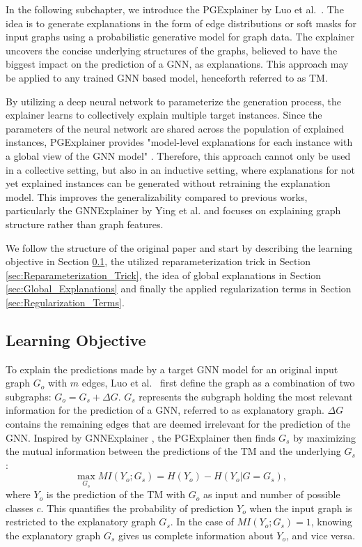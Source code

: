 In the following subchapter, we introduce the PGExplainer by Luo et al.~\cite{luo2020parameterized}. The idea is to generate explanations in the form of edge distributions or soft masks for input graphs using a probabilistic generative model for graph data. The explainer uncovers the concise underlying structures of the graphs, believed to have the biggest impact on the prediction of a GNN, as explanations. This approach may be applied to any trained GNN based model, henceforth referred to as \ac{TM}. 

By utilizing a deep neural network to parameterize the generation process, the explainer learns to collectively explain multiple target instances. Since the parameters of the neural network are shared across the population of explained instances, PGExplainer provides "model-level explanations for each instance with a global view of the GNN model" \cite{luo2020parameterized}. Therefore, this approach cannot only be used in a collective setting, but also in an inductive setting, where explanations for not yet explained instances can be generated without retraining the explanation model. This improves the generalizability compared to previous works, particularly the GNNExplainer by Ying et al. \cite{ying2019gnnexplainer} and focuses on explaining graph structure rather than graph features. \bigskip

We follow the structure of the original paper \cite{luo2020parameterized} and start by describing the learning objective in Section \ref{sec:learning_objective}, the utilized reparameterization trick in Section \ref{sec:Reparameterization_Trick}, the idea of global explanations in Section \ref{sec:Global_Explanations} and finally the applied regularization terms in Section \ref{sec:Regularization_Terms}.

\subsection{Learning Objective}
\label{sec:learning_objective}
To explain the predictions made by a target GNN model for an original input graph $G_o$ with $m$ edges, Luo et al.~\cite{luo2020parameterized} first define the graph as a combination of two subgraphs: $G_o = G_s + \Delta G$. $G_s$ represents the subgraph holding the most relevant information for the prediction of a GNN, referred to as explanatory graph. $\Delta G$ contains the remaining edges that are deemed irrelevant for the prediction of the GNN. Inspired by GNNExplainer \cite{ying2019gnnexplainer}, the PGExplainer then finds $G_s$ by maximizing the mutual information between the predictions of the \ac{TM} and the underlying $G_s$:
\begin{equation}
    \max_{G_s} MI(Y_o;G_s) = H(Y_o) - H(Y_o|G=G_s),
\end{equation} 
where $Y_o$ is the prediction of the \ac{TM} with $G_o$ as input and number of possible classes $c$. This quantifies the probability of prediction $Y_o$ when the input graph is restricted to the explanatory graph $G_s$. In the case of $MI(Y_o;G_s) = 1$, knowing the explanatory graph $G_s$ gives us complete information about $Y_o$, and vice versa.

